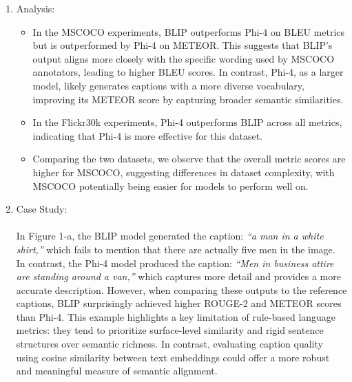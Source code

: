 \documentclass{article}
\begin{document}
\begin{enumerate}
	\item Analysis:
	\begin{itemize}
		\item In the MSCOCO experiments, BLIP outperforms Phi-4 on BLEU metrics but is outperformed by Phi-4 on METEOR. This suggests that BLIP's output aligns more closely with the specific wording used by MSCOCO annotators, leading to higher BLEU scores. In contrast, Phi-4, as a larger model, likely generates captions with a more diverse vocabulary, improving its METEOR score by capturing broader semantic similarities.
		
		\item In the Flickr30k experiments, Phi-4 outperforms BLIP across all metrics, indicating that Phi-4 is more effective for this dataset.

		\item Comparing the two datasets, we observe that the overall metric scores are higher for MSCOCO, suggesting differences in dataset complexity, with MSCOCO potentially being easier for models to perform well on.\\ 
	\end{itemize}

	\item Case Study: \\
		\\ 
		In Figure 1-a, the BLIP model generated the caption: \textit{``a man in a white shirt,''} which fails to mention that there are actually five men in the image. In contrast, the Phi-4 model produced the caption: \textit{``Men in business attire are standing around a van,''} which captures more detail and provides a more accurate description. However, when comparing these outputs to the reference captions, BLIP surprisingly achieved higher ROUGE-2 and METEOR scores than Phi-4. This example highlights a key limitation of rule-based language metrics: they tend to prioritize surface-level similarity and rigid sentence structures over semantic richness. In contrast, evaluating caption quality using cosine similarity between text embeddings could offer a more robust and meaningful measure of semantic alignment.
	\newpage
	\begin{figure}[h!]
		\centering


\end{figure}
\end{enumerate}
\end{document}
